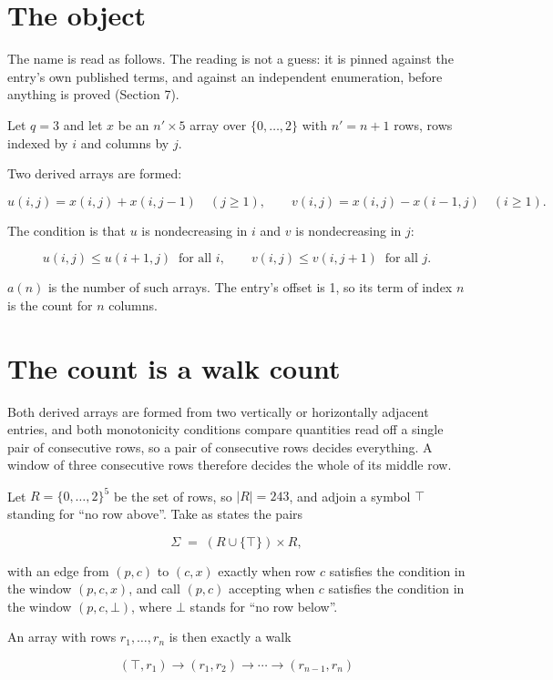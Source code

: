 \documentclass[11pt]{article}
\theoremstyle{definition}
\begin{document}
\section{The object}

The name is read as follows. The reading is not a guess: it is pinned against the entry's own published terms, and against an independent enumeration, before anything is proved (Section 7).

Let $q = 3$ and let $x$ be an $n' \times 5$ array over $\{0,\dots,2\}$ with $n' = n + 1$ rows, rows indexed by $i$ and columns by $j$.

Two derived arrays are formed:

\[u(i,j) = x(i,j) + x(i,j{-}1)\quad (j \ge 1), \qquad v(i,j) = x(i,j) - x(i{-}1,j)\quad (i \ge 1).\]

The condition is that $u$ is nondecreasing in $i$ and $v$ is nondecreasing in $j$:

\[u(i,j) \le u(i{+}1,j) \ \text{ for all } i, \qquad v(i,j) \le v(i,j{+}1) \ \text{ for all } j.\]

$a(n)$ is the number of such arrays. The entry's offset is 1, so its term of index $n$ is the count for $n$ columns.

\section{The count is a walk count}

Both derived arrays are formed from two vertically or horizontally adjacent entries, and both monotonicity conditions compare quantities read off a single pair of consecutive rows, so a pair of consecutive rows decides everything. A window of three consecutive rows therefore decides the whole of its middle row.

Let $R = \{0,\dots,2\}^{5}$ be the set of rows, so $|R| = 243$, and adjoin a symbol $\top$ standing for ``no row above''. Take as states the pairs

\[\Sigma \;=\; (R \cup \{\top\}) \times R,\]

with an edge from $(p,c)$ to $(c,x)$ exactly when row $c$ satisfies the condition in the window $(p,c,x)$, and call $(p,c)$ accepting when $c$ satisfies the condition in the window $(p,c,\bot)$, where $\bot$ stands for ``no row below''.

An array with rows $r_1,\dots,r_n$ is then exactly a walk

\[(\top,r_1) \to (r_1,r_2) \to \cdots \to (r_{n-1},r_n)\]
\end{document}

